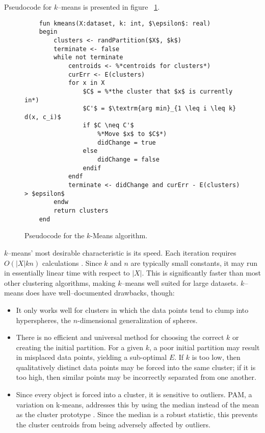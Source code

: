 Pseudocode for $k$--means is presented in figure ~\ref{fig:kmeans}.
\begin{figure}
	\begin{lstlisting}
	fun kmeans(X:dataset, k: int, $\epsilon$: real)
	begin
		clusters <- randPartition($X$, $k$)
		terminate <- false
		while not terminate
			centroids <- %*centroids for clusters*)
			curErr <- E(clusters)
			for x in X
				$C$ = %*the cluster that $x$ is currently in*)
				$C'$ = $\textrm{arg min}_{1 \leq i \leq k} d(x, c_i)$
				if $C \neq C'$
					%*Move $x$ to $C$*)
					didChange = true
				else
					didChange = false
				endif
			endf
			terminate <- didChange and curErr - E(clusters) > $epsilon$
		endw
		return clusters
	end
	\end{lstlisting}
	\caption{Pseudocode for the $k$-Means algorithm.}
	\label{fig:kmeans}
\end{figure}
$k$--means' most desirable characteristic is its speed. Each iteration requires $O(|X|kn)$ calculations \citep{phillips02}. Since $k$ and $n$ are typically small constants, it may run in essentially linear time with respect to $|X|$. This is significantly faster than most other clustering algorithms, making $k$--means well suited for large datasets. $k$--means does have well--documented drawbacks, though:
	\begin{itemize}
		\item It only works well for clusters in which the data points tend to clump into hyperspheres, the $n$-dimensional generalization of spheres.
		\item There is no efficient and universal method for choosing the correct $k$ or creating the initial partition. For a given $k$, a poor initial partition may result in misplaced data points, yielding a sub-optimal $E$. If $k$ is too low, then qualitatively distinct data points may be forced into the same cluster; if it is too high, then similar points may be incorrectly separated from one another.
		\item Since every object is forced into a cluster, it is sensitive to outliers. PAM, a variation on k-means, addresses this by using the median instead of the mean as the cluster prototype \citep{kaufman90}. Since the median is a robust statistic, this prevents the cluster centroids from being adversely affected by outliers.
	\end{itemize}
